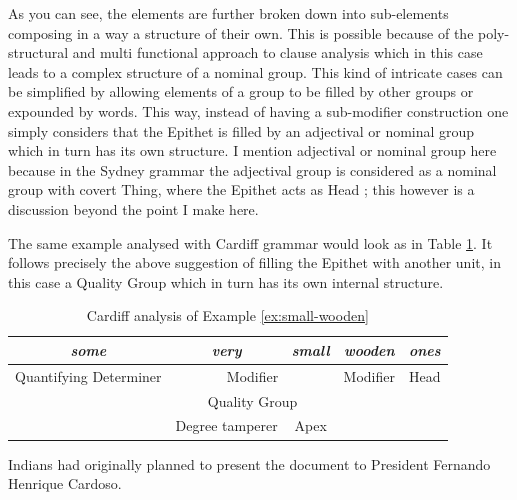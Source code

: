     As you can see, the elements are further broken down into sub-elements composing in a way a structure of their own. This is possible because of the poly-structural and multi functional approach to clause analysis which in this case leads to a complex structure of a nominal group. This kind of intricate cases can be simplified by allowing elements of a group to be filled by other groups or expounded by words. This way, instead of having a sub-modifier construction one simply considers that the Epithet is filled by an adjectival or nominal group which in turn has its own structure. I mention adjectival or nominal group here because in the Sydney grammar the adjectival group is considered as a nominal group with covert Thing, where the Epithet acts as Head \citep[391]{ifg4}; this however is a discussion beyond the point I make here. 
    
    The same example analysed with Cardiff grammar would look as in Table \ref{tab:example-substructure-analisys-cardiff}. It follows precisely the above suggestion of filling the Epithet with another unit, in this case a Quality Group which in turn has its own internal structure. 
    
    \begin{table}[!ht]
        \centering
        \begin{tabular}{c|c|c|cc}
            \hline
            \multicolumn{1}{|c|}{\textit{some}}          & \textit{very}     & \textit{small} & \multicolumn{1}{c|}{\textit{wooden}} & \multicolumn{1}{c|}{\textit{ones}} \\ \hline
            \multicolumn{1}{|c|}{Quantifying Determiner} & \multicolumn{2}{c|}{Modifier}      & \multicolumn{1}{c|}{Modifier}        & \multicolumn{1}{c|}{Head}          \\ \hline
            & \multicolumn{2}{c|}{Quality Group} &                                      &                                    \\ \cline{2-3}
            & Degree tamperer & Apex           &                                      &                                    \\ \cline{2-3}
        \end{tabular}
        \caption{Cardiff analysis of Example \ref{ex:small-wooden}}
        \label{tab:example-substructure-analisys-cardiff}
    \end{table}
    
    
    \begin{exe}
        \ex \label{ex:indians-planned} Indians had originally planned to present the document to President Fernando Henrique Cardoso.
    \end{exe}

